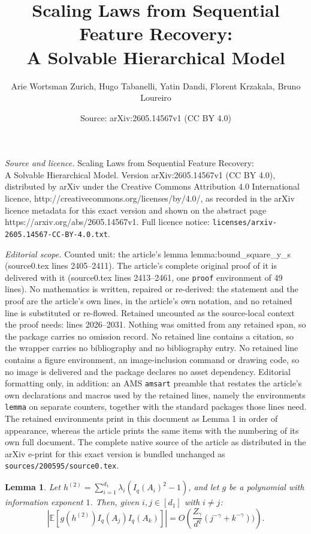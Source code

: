 \documentclass[10pt,a4paper]{amsart}
\title{Scaling Laws from Sequential Feature Recovery:\\ A Solvable Hierarchical Model}
\author{Arie Wortsman Zurich, Hugo Tabanelli, Yatin Dandi, Florent Krzakala, Bruno Loureiro}
\date{Source: arXiv:2605.14567v1 (CC BY 4.0)}
\newtheorem{lemma}{Lemma}
\newcommand{\EE}{\mathbb{E}}
\begin{document}
\maketitle

\noindent\emph{Source and licence.} Scaling Laws from Sequential Feature Recovery:\\ A Solvable Hierarchical Model. Version arXiv:2605.14567v1 (CC BY 4.0), distributed by arXiv under the Creative Commons Attribution 4.0 International licence, http://creativecommons.org/licenses/by/4.0/, as recorded in the arXiv licence metadata for this exact version and shown on the abstract page https://arxiv.org/abs/2605.14567v1. Full licence notice: \texttt{licenses/arxiv-2605.14567-CC-BY-4.0.txt}.\par\smallskip

\noindent\textit{Editorial scope.} Counted unit: the article's lemma lemma:bound\_square\_y\_s (source0.tex lines 2405--2411). The article's complete original proof of it is delivered with it (source0.tex lines 2413--2461, one \texttt{proof} environment of 49 lines). No mathematics is written, repaired or re-derived: the statement and the proof are the article's own lines, in the article's own notation, and no retained line is substituted or re-flowed.  Retained uncounted as the source-local context the proof needs: lines 2026--2031.  Nothing was omitted from any retained span, so the package carries no omission record.  No retained line contains a citation, so the wrapper carries no bibliography and no bibliography entry.  No retained line contains a figure environment, an image-inclusion command or drawing code, so no image is delivered and the package declares no asset dependency.  Editorial formatting only, in addition: an AMS \texttt{amsart} preamble that restates the article's own declarations and macros used by the retained lines, namely the environments \texttt{lemma} on separate counters, together with the standard packages those lines need.  The retained environments print in this document as Lemma 1 in order of appearance, whereas the article prints the same items with the numbering of its own full document.  The complete native source of the article as distributed in the arXiv e-print for this exact version is bundled unchanged as \texttt{sources/200595/source0.tex}.
\begin{lemma}
    Let $h^{(2)} = \sum_{i=1}^{d_1} \lambda_i (I_{q}(A_i)^{2} -1)$, and let $g$ be a polynomial with information exponent $1$. Then, given $i, j \in [d_1]$ with $i \not = j$: 
    \[
     \left | \EE \left [ g(h^{(2)}) I_{q}(A_j) I_{q}(A_k)\right ] \right | = O \left ( \dfrac{Z_\gamma}{d^{q}}(j^{-\gamma} + k^{-\gamma}))\right ). 
    \]\label{lemma:non_linear_case_cross_expectations}
\end{lemma}
\end{document}
